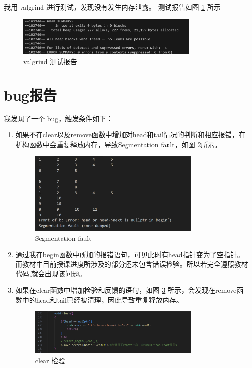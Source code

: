 \documentclass[UTF8]{ctexart}
\begin{document}
我用 valgrind 进行测试，发现没有发生内存泄露。
测试报告如图 \ref{fig:valgrind} 所示
\begin{figure}[h]
    \centering
    \includegraphics[width=0.8\textwidth]{内存泄漏检查.png} 
    \caption{valgrind 测试报告}
    \label{fig:valgrind}
\end{figure}

\section{bug报告}

我发现了一个 bug，触发条件如下：

\begin{enumerate}
    \item 如果不在clear以及remove函数中增加对head和tail情况的判断和相应报错，在析构函数中会重复释放内存，导致Segmentation fault，如图 \ref{fig:error}所示。
    \begin{figure}[h]
        \centering
        \includegraphics[width=0.8\textwidth]{Segmentaion fault.png} 
        \caption{Segmentation fault}
        \label{fig:error}
    \end{figure}
    \item 通过我在begin函数中所加的报错语句，可见此时有head指针变为了空指针。而教材中目前授课进度所涉及的部分还未包含错误检验。所以若完全遵照教材代码,就会出现该问题。
    \item 如果在clear函数中增加检验和反馈的语句，如图 \ref{fig:test} 所示，会发现在remove函数中的head和tail已经被清理，因此导致重复释放内存。
    \begin{figure}[h]
        \centering
        \includegraphics[width=0.8\textwidth]{报错语句.png} 
        \caption{clear 检验}
        \label{fig:test}
    \end{figure}

\end{enumerate}
\end{document}
